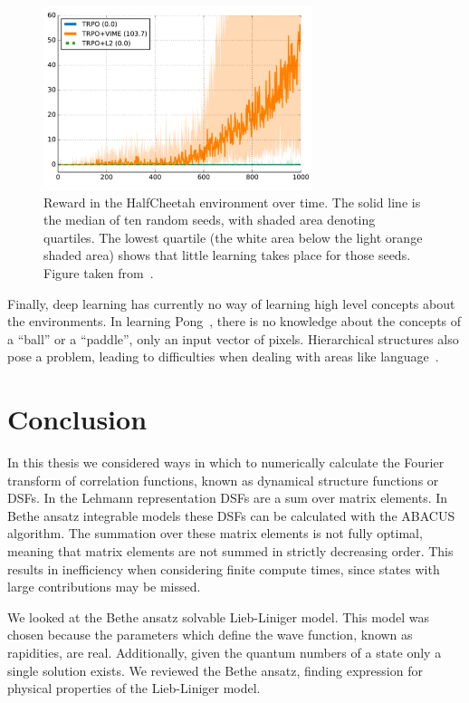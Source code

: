 \documentclass[11pt, a4paper]{report} %
\begin{document}
\begin{figure}[tb!]
  \centering
  \includegraphics[width=0.7\textwidth]{rllearningtrouble.png}
  \caption{Reward in the HalfCheetah environment over time. The solid line is the median of ten random seeds, with shaded area denoting quartiles. The lowest quartile (the white area below the light orange shaded area) shows that little learning takes place for those seeds. Figure taken from~\cite{houthooft16_vime}.}\label{fig:halfcheetah}
\end{figure}



Finally, deep learning has currently no way of learning high level concepts about the environments.
In learning Pong~\cite{mnih13_playin_atari_with_deep_reinf_learn,mnih15_human_level_contr_throug_deep_reinf_learn}, there is no knowledge about the concepts of a ``ball'' or a ``paddle'', only an input vector of pixels.
Hierarchical structures also pose a problem, leading to difficulties when dealing with areas like language~\cite{marcus18_deep_learn}. 


\section{Conclusion}

In this thesis we considered ways in which to numerically calculate the Fourier transform of correlation functions, known as dynamical structure functions or DSFs.
In the Lehmann representation DSFs are a sum over matrix elements.
In Bethe ansatz integrable models these DSFs can be calculated with the ABACUS algorithm.
The summation over these matrix elements is not fully optimal, meaning that matrix elements are not summed in strictly decreasing order.
This results in inefficiency when considering finite compute times, since states with large contributions may be missed.

We looked at the Bethe ansatz solvable Lieb-Liniger model.
This model was chosen because the parameters which define the wave function, known as rapidities, are real.
Additionally, given the quantum numbers of a state only a single solution exists.
We reviewed the Bethe ansatz, finding expression for physical properties of the Lieb-Liniger model.
\end{document}
